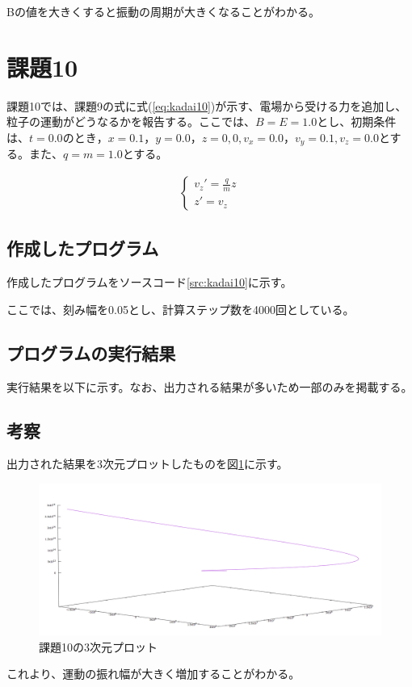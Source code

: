 \documentclass[11pt,titlepage]{jsarticle}
\begin{document}
Bの値を大きくすると振動の周期が大きくなることがわかる。

\section{課題10}
課題10では、課題9の式に式(\ref{eq:kadai10})が示す、電場から受ける力を追加し、粒子の運動がどうなるかを報告する。ここでは、$B=E=1.0$とし、初期条件は、$t=0.0のとき，x=0.1，y=0.0，z=0,0,v_x=0.0，v_y=0.1,v_z=0.0$とする。また、$q=m=1.0$とする。

\begin{eqnarray}
\label{eq:kadai10}
	\left\{
		\begin{array}{l}
			v_z'=\frac{q}{m}z\\
			z'=v_z
		\end{array}
	\right.
\end{eqnarray}

\subsection{作成したプログラム}
作成したプログラムをソースコード\ref{src:kadai10}に示す。


ここでは、刻み幅を0.05とし、計算ステップ数を4000回としている。

\subsection{プログラムの実行結果}
実行結果を以下に示す。なお、出力される結果が多いため一部のみを掲載する。
\begin{oframed}
\end{oframed}


\subsection{考察}
出力された結果を3次元プロットしたものを図\ref{fig:kadai10}に示す。

\begin{figure}[H]
\centering
\includegraphics[width=12cm]{img/kadai10.png}
\caption{課題10の3次元プロット}
\label{fig:kadai10}
\end{figure}

これより、運動の振れ幅が大きく増加することがわかる。
\end{document}
